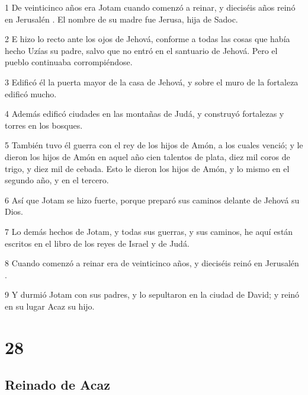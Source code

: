 \par 1 De veinticinco años era Jotam cuando comenzó a reinar, y dieciséis años reinó en Jerusalén . El nombre de su madre fue Jerusa, hija de Sadoc.
\par 2 E hizo lo recto ante los ojos de Jehová, conforme a todas las cosas que había hecho Uzías su padre, salvo que no entró en el santuario de Jehová. Pero el pueblo continuaba corrompiéndose.
\par 3 Edificó él la puerta mayor de la casa de Jehová, y sobre el muro de la fortaleza edificó mucho.
\par 4 Además edificó ciudades en las montañas de Judá, y construyó fortalezas y torres en los bosques.
\par 5 También tuvo él guerra con el rey de los hijos de Amón, a los cuales venció; y le dieron los hijos de Amón en aquel año cien talentos de plata,  diez mil coros de trigo, y diez mil de cebada. Esto le dieron los hijos de Amón, y lo mismo en el segundo año, y en el tercero.
\par 6 Así que Jotam se hizo fuerte, porque preparó sus caminos delante de Jehová su Dios.
\par 7 Lo demás hechos de Jotam, y todas sus guerras, y sus caminos, he aquí están escritos en el libro de los reyes de Israel y de Judá.
\par 8 Cuando comenzó a reinar era de veinticinco años, y dieciséis reinó en Jerusalén .
\par 9 Y durmió Jotam con sus padres, y lo sepultaron en la ciudad de David; y reinó en su lugar Acaz su hijo.

\chapter{28}

\section*{Reinado de Acaz}


